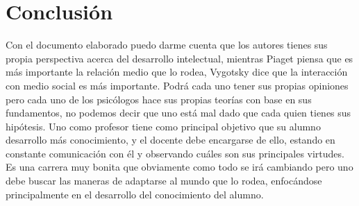 \documentclass{bmcart}
\begin{document}
  \section{Conclusión}
  Con el documento elaborado puedo darme cuenta que los autores tienes sus propia perspectiva acerca del desarrollo intelectual, mientras Piaget piensa que es más importante la relación medio que lo rodea, Vygotsky dice que la interacción con medio social es más importante. Podrá cada uno tener sus propias opiniones pero cada uno de los psicólogos hace sus propias teorías con base en sus fundamentos, no podemos decir que uno está mal dado que cada quien tienes sus hipótesis. 
  Uno como profesor tiene como principal objetivo que su alumno desarrollo más conocimiento, y el docente debe encargarse de ello, estando en constante comunicación con él y observando cuáles son sus principales virtudes.
  Es una carrera muy bonita que obviamente como todo se irá cambiando pero uno debe buscar las maneras de adaptarse al mundo que lo rodea, enfocándose principalmente en el desarrollo del conocimiento del alumno.
  



\end{document}
